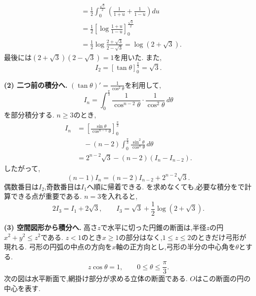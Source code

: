 \begin{enumerate}[label=\textbf{問\arabic*.},leftmargin=3.8em,format=\bookitemlink{practice-entrance}{solution}{problem}]
\[\begin{aligned}
        &=\frac12\int_0^{\frac{\sqrt3}{2}}
        \left(\frac1{1+u}+\frac1{1-u}\right)du\\
        &=\frac12\left[\log\frac{1+u}{1-u}\right]_0^{\frac{\sqrt3}{2}}\\
        &=\frac12\log\frac{2+\sqrt3}{2-\sqrt3}
        =\log(2+\sqrt3).
      \end{aligned}
    \]
    最後には$(2+\sqrt3)(2-\sqrt3)=1$を用いた.
    また,
    \[
      I_2=[\tan\theta]_0^{\frac{\pi}{3}}=\sqrt3.
    \]
    \par\noindent
    \textbf{(2) 二つ前の積分へ.}
    $(\tan\theta)'=\frac{1}{\cos^2\theta}$を利用して,
    \[
      I_n=\int_0^{\frac{\pi}{3}}
      \frac1{\cos^{n-2}\theta}\cdot\frac1{\cos^2\theta}\,d\theta
    \]
    を部分積分する.
    $n\geq3$のとき,
    \[
      \begin{aligned}
        I_n
        &=\left[\frac{\sin\theta}{\cos^{n-1}\theta}\right]_0^{\frac{\pi}{3}}\\
        &\quad -(n-2)\int_0^{\frac{\pi}{3}}
        \frac{\sin^2\theta}{\cos^n\theta}\,d\theta\\
        &=2^{n-2}\sqrt3-(n-2)(I_n-I_{n-2}).
      \end{aligned}
    \]
    したがって,
    \[
      (n-1)I_n=(n-2)I_{n-2}+2^{n-2}\sqrt3.
    \]
    偶数番目は$I_2$,奇数番目は$I_1$へ順に帰着できる.
    を求めなくても,必要な積分をで計算できる点が重要である.
    $n=3$を入れると,
    \[
      2I_3=I_1+2\sqrt3,
      \qquad
      I_3=\sqrt3+\frac12\log(2+\sqrt3).
    \]
    \par\noindent
    \textbf{(3) 空間図形から積分へ.}
    高さ$z$で水平に切った円錐の断面は,半径$z$の円$x^2+y^2\leq z^2$である.
    $z<1$のとき$x\geq1$の部分はなく,$1\leq z\leq2$のときだけ弓形が現れる.
    弓形の円弧の中点の方向を$x$軸の正方向とし,弓形の半分の中心角を$\theta$とする.
    \[
      z\cos\theta=1,\qquad 0\leq\theta\leq\frac\pi3.
    \]
    次の図は水平断面で,網掛け部分が求める立体の断面である.
    $O$はこの断面の円の中心を表す.
    \begin{center}
\end{center}
\end{enumerate}
